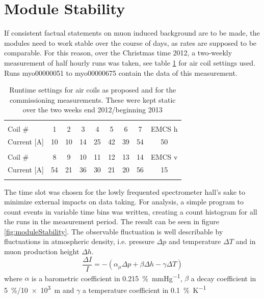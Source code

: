   \section{Module Stability}
  \label{ch:Analysis:sec:Module Stability}
  If consistent factual statements on muon induced background are to be made, the modules need to work stable over the course of days, as rates are supposed to be comparable. For this reason, over the Christmas time 2012, a two-weekly measurement of half hourly runs was taken, see table \ref{tab:airCoilSettingsChristmas} for air coil settings used. Runs myo00000051 to myo00000675 contain the data of this measurement.
  \begin{table}
  \centering
   \begin{tabular}{|l|ccccccc|c|}
    \hline
    &&&&&&&&\\
    Coil \#	&1	&2	&3	&4	&5	&6	&7	&EMCS h	\\
    Current [A]	&10	&10	&14	&25	&42	&39	&54	&50  	\\
    &&&&&&&&\\
    Coil \# 	&8	&9	&10	&11	&12	&13	&14	&EMCS v	\\
    Current [A]	&54	&21	&36	&30	&21	&20	&56	&15    	\\
    &&&&&&&&\\
    \hline
   \end{tabular}
  \caption[LFCS settings stability measurement]{Runtime settings for air coils as proposed and for the commissioning measurements. These were kept static over the two weeks end 2012/beginning 2013}
  \label{tab:airCoilSettingsChristmas}
  \end{table}
  The time slot was chosen for the lowly frequented spectrometer hall's sake to minimize external impacts on data taking. For analysis, a simple program to count events in variable time bins was written, creating a count histogram for all the runs in the measurement period. The result can be seen in figure \ref{fig:moduleStability}. The observable fluctuation is well describable by fluctuations in atmospheric density, i.e. pressure $\Delta p$ and temperature $\Delta T$ and in muon production height $\Delta h$\cite{muonIntensity}.
  \begin{equation}
  	\frac{\Delta I}{I} = - (\alpha_\mu\Delta p + \beta \Delta h -\gamma \Delta T)
  \end{equation}
  where $\alpha$ is a barometric coefficient in \SI{0.215}{\percent\per\mmHg}, $\beta$ a decay coefficient in \SI{5}{\percent}/\SI{10e3}{\meter} and $\gamma$ a temperature coefficient in \SI{0.1}{\percent\per\kelvin}
